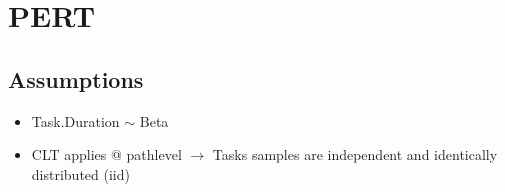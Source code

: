 \documentclass[letterpaper,10pt,english]{jupyterBook}
\begin{document}
\section{PERT}
\label{\detokenize{PM/jcsrua:pert}}

\subsection{Assumptions}
\label{\detokenize{PM/jcsrua:assumptions}}\begin{itemize}
\item {} 
\sphinxAtStartPar
Task.Duration \(\sim\) Beta

\item {} 
\sphinxAtStartPar
CLT applies @ path\sphinxhyphen{}level \(\rightarrow\) Tasks samples are independent and identically distributed (iid)

\end{itemize}
\end{document}
